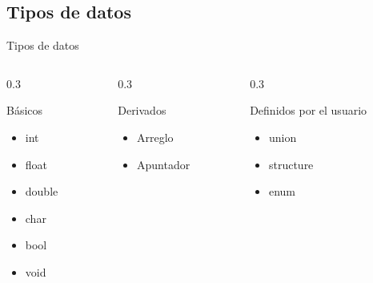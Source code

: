 \documentclass[handout, 14pt]{beamer}
\begin{document}
\subsection{Tipos de datos}
\begin{frame}{Tipos de datos}
    \begin{columns}{}
        \begin{column}{0.3\textwidth}
            \begin{block}{Básicos}
                \begin{itemize}
                    \item int
                    \item float
                    \item double
                    \item char
                    \item bool
                    \item void
                \end{itemize}
            \end{block}
        \end{column}

        \begin{column}{0.3\textwidth}
            \begin{block}{Derivados}
                \begin{itemize}
                    \item Arreglo
                    \item Apuntador
                \end{itemize}
            \end{block}
        \end{column}
        \begin{column}{0.3\textwidth}
            \begin{block}{Definidos por el usuario}
                \begin{itemize}
                    \item union
                    \item structure
                    \item enum
                \end{itemize}
            \end{block}
        \end{column}
    \end{columns}
    \cite{gfg_tipos}
\end{frame}
\end{document}
